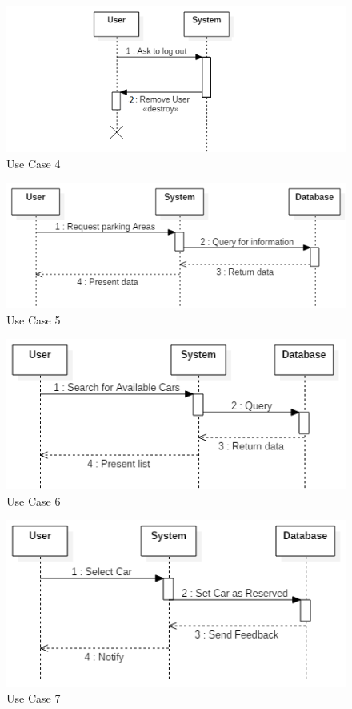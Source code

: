 \FloatBarrier
\begin{figure}[h]
\centering
\includegraphics[width=\linewidth,keepaspectratio]{../Diagrams/SD/UC_4.png}
\caption{Use Case 4}
\end{figure}
\FloatBarrier
\begin{figure}[h]
\centering
\includegraphics[width=\linewidth,keepaspectratio]{../Diagrams/SD/UC_5.png}
\caption{Use Case 5}
\end{figure}
\FloatBarrier
\begin{figure}[h]
\centering
\includegraphics[width=\linewidth,keepaspectratio]{../Diagrams/SD/UC_6.png}
\caption{Use Case 6}
\end{figure}
\FloatBarrier
\begin{figure}[h]
\centering
\includegraphics[width=\linewidth,keepaspectratio]{../Diagrams/SD/UC_7.png}
\caption{Use Case 7}
\end{figure}
